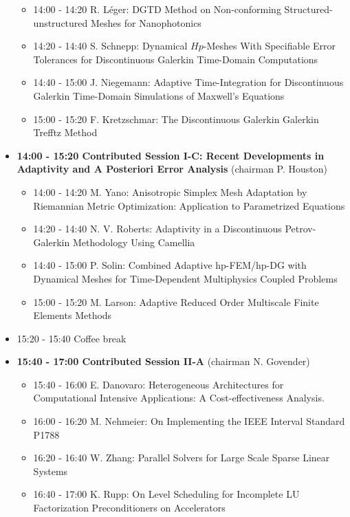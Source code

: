 \documentclass[10pt]{article}%
\begin{document}
\begin{itemize}
  \begin{itemize}
    \item 14:00 - 14:20 {R. Léger}: {DGTD  Method  on  Non-conforming  Structured-unstructured  Meshes  for Nanophotonics}
    \item 14:20 - 14:40 {S. Schnepp}: {Dynamical $Hp$-Meshes With Specifiable Error Tolerances for Discontinuous Galerkin Time-Domain Computations}
    \item 14:40 - 15:00 {J. Niegemann}: {Adaptive Time-Integration for Discontinuous Galerkin Time-Domain Simulations of Maxwell's Equations}
    \item 15:00 - 15:20 {F. Kretzschmar}: {The Discontinuous Galerkin Galerkin Trefftz Method}
  \end{itemize}
    \item {\bf 14:00 - 15:20 Contributed Session I-C: Recent Developments in Adaptivity and A Posteriori Error Analysis} (chairman P. Houston) 
  \begin{itemize}
    \item 14:00 - 14:20 {M. Yano}: {Anisotropic Simplex Mesh Adaptation by Riemannian Metric Optimization: Application to Parametrized Equations}
    \item 14:20 - 14:40 {N. V. Roberts}: {Adaptivity in a Discontinuous Petrov-Galerkin Methodology Using Camellia}
    \item 14:40 - 15:00 {P. Solin}: Combined Adaptive hp-FEM/hp-DG with Dynamical Meshes for Time-Dependent Multiphysics Coupled Problems
    \item 15:00 - 15:20 {M. Larson}: Adaptive Reduced Order Multiscale Finite Elements Methods
  \end{itemize}
  \item 15:20 - 15:40 Coffee break
  \newpage
  \item {\bf 15:40 - 17:00 Contributed Session II-A} (chairman N. Govender) 
  \begin{itemize}
    \item 15:40 - 16:00 {E. Danovaro}: {Heterogeneous Architectures for Computational Intensive Applications: A Cost-effectiveness Analysis.}
    \item 16:00 - 16:20 {M. Nehmeier}: {On Implementing the IEEE Interval Standard P1788}
    \item 16:20 - 16:40 {W. Zhang}: {Parallel Solvers for Large Scale Sparse Linear Systems} %
    \item 16:40 - 17:00 {K. Rupp}: {On Level Scheduling for Incomplete LU Factorization Preconditioners on Accelerators}

\end{itemize}
\end{itemize}
\end{document}
